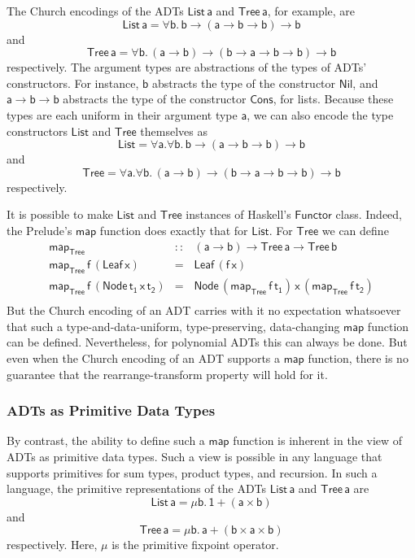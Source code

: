 \documentclass[acmsmall,screen,review,anonymous]{acmart}
\theoremstyle{definition}
\begin{document}
The Church encodings of the ADTs $\mathsf{List\,a}$ and
$\mathsf{Tree\,a}$, for example, are
\[\mathsf{List\,a} = \mathsf{\forall b.\,b \to (a \to b \to b) \to b}\]
and 
\[\mathsf{Tree\,a} = \mathsf{\forall b.\,(a \to b) \to (b \to a \to b
  \to b) \to b}\] respectively. The argument types are abstractions
of the types of ADTs' constructors. For instance, $\mathsf{b}$
abstracts the type of the constructor $\mathsf{Nil}$, and $\mathsf{a
  \to b \to b}$ abstracts the type of the constructor $\mathsf{Cons}$,
for lists. Because these types are each uniform in their argument type
$\mathsf{a}$, we can also encode the type constructors $\mathsf{List}$
and $\mathsf{Tree}$ themselves as
\[\mathsf{List} = \mathsf{\forall a. \forall b.\,b \to (a \to b \to b)
  \to b}\] 
and 
\[\mathsf{Tree} = \mathsf{\forall a. \forall b.\,(a \to b) \to (b \to
  a \to b \to b) \to b}\]
respectively. 

It is possible to make $\mathsf{List}$ and $\mathsf{Tree}$ instances
of Haskell's $\mathsf{Functor}$ class. Indeed, the Prelude's
$\mathsf{map}$ function does exactly that for $\mathsf{List}$. For
$\mathsf{Tree}$ we can define
\[\begin{array}{lll}
\mathsf{map_{Tree}} & \mathsf{::} & \mathsf{(a \to b) \to Tree\,a \to Tree \,b}\\
\mathsf{map_{Tree}\, f\, (Leaf\,x)} & \mathsf{=} & \mathsf{Leaf\,(f\,x)}\\
\mathsf{map_{Tree}\, f\, (Node\,t_1\,x\,t_2)} & \mathsf{=} &
\mathsf{Node\,(map_{Tree}\, f \,t_1)\,x\,(map_{Tree}\,f\,t_2)}\\
\end{array}\]
But the Church encoding of an ADT carries with it no expectation
whatsoever that such a type-and-data-uniform, type-preserving,
data-changing $\mathsf{map}$ function can be defined. Nevertheless,
for polynomial ADTs this can always be done. But even when the Church
encoding of an ADT supports a $\mathsf{map}$ function, there is no
guarantee that the rearrange-transform property will hold for it.

\subsubsection{ADTs as Primitive Data Types}

By contrast, the ability to define such a $\mathsf{map}$ function is
inherent in the view of ADTs as primitive data types. Such a view is
possible in any language that supports primitives for sum types,
product types, and recursion. In such a language, the primitive
representations of the ADTs $\mathsf{List\,a}$ and $\mathsf{Tree\,a}$
are
\[\mathsf{List\,a} = \mathsf{\mu b.\, 1 + (a \times b)}\] 
and 
\[\mathsf{Tree\,a} = \mathsf{\mu b.\, a + (b \times a \times b)}\]
respectively. Here, $\mathsf{\mu}$ is the primitive fixpoint
operator.
\end{document}
